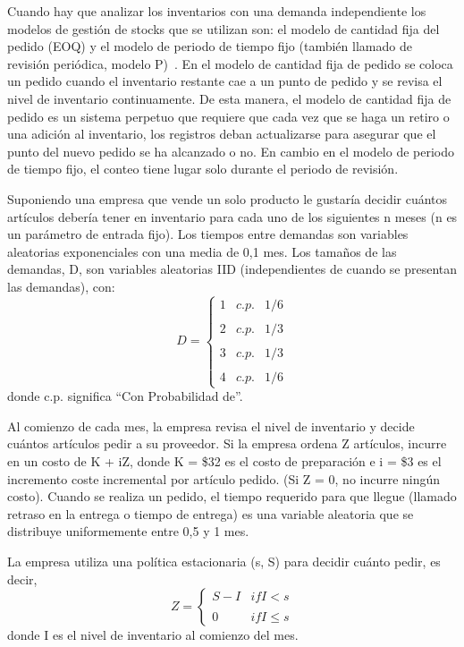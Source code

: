 Cuando hay que analizar los inventarios con una demanda independiente los modelos de
gestión de stocks que se utilizan son: el modelo de cantidad fija del pedido (EOQ) y el
modelo de periodo de tiempo fijo (también llamado de revisión periódica, modelo P)~\cite{chase2004administracion,krajewski2008administracion}.
En el modelo de cantidad fija de pedido se coloca un pedido cuando el inventario restante cae a
un punto de pedido y se revisa el nivel de inventario continuamente.
De esta manera, el modelo de cantidad fija de pedido es un sistema perpetuo que requiere que cada
vez que se haga un retiro o una adición al inventario, los registros deban actualizarse para
asegurar que el punto del nuevo pedido se ha alcanzado o no.
En cambio en el modelo de periodo de
tiempo fijo, el conteo tiene lugar solo durante el periodo de revisión.

Suponiendo una empresa que vende un solo producto le gustaría decidir cuántos artículos debería
tener en inventario para cada uno de los siguientes n meses (n es un parámetro de entrada fijo).
Los tiempos entre demandas son variables aleatorias exponenciales con una media de 0,1 mes.
Los tamaños de las demandas, D, son variables aleatorias IID (independientes de cuando se presentan
las demandas), con:
\begin{equation}
  \label{eq:equation9}
  D=\left\{ \begin{array}{lcc}
            1 &   c.p.  & 1/6 \\
            \\ 2 &  c.p. & 1/3 \\
            \\ 3 &  c.p. & 1/3 \\
            \\ 4 &  c.p.  & 1/6
  \end{array}
  \right.
\end{equation}
donde c.p. significa ``Con Probabilidad de''.

Al comienzo de cada mes, la empresa revisa el nivel de inventario y decide cuántos artículos pedir
a su proveedor.
Si la empresa ordena Z artículos, incurre en un costo de K + iZ, donde K = \$32 es el costo de
preparación e i = \$3 es el incremento coste incremental por artículo pedido.
(Si Z = 0, no incurre ningún costo).
Cuando se realiza un pedido, el tiempo requerido para que llegue (llamado retraso en la entrega
o tiempo de entrega) es una variable aleatoria que se distribuye uniformemente entre 0,5 y 1 mes.

La empresa utiliza una política estacionaria (s, S) para decidir cuánto pedir, es decir,
\begin{equation}
  \label{eq:equation10}
  Z = \left\{ \begin{array}{lcc}
                S-I & if I < s \\
                \\ 0 & if I \leq s
  \end{array}
  \right.
\end{equation}
donde I es el nivel de inventario al comienzo del mes.

